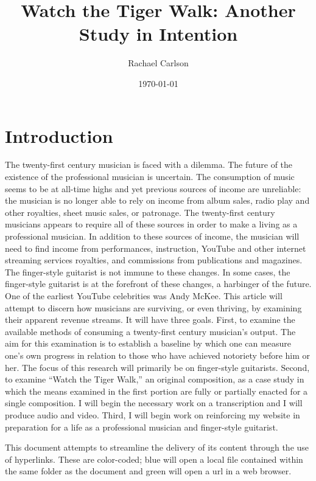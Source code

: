 \documentclass[unicode,hyperfootnotes=false,xetex,colorlinks=true,nofonts,nobib]{tufte-handout}
\title{Watch the Tiger Walk: Another Study in Intention}
\author{Rachael Carlson}
\date{\today}
\begin{document}
\maketitle

\section{Introduction}
The twenty-first century musician is faced with a dilemma. The future of the existence of the professional musician is uncertain. The consumption of music seems to be at all-time highs and yet previous sources of income are unreliable: the musician is no longer able to rely on income from album sales, radio play and other royalties, sheet music sales, or patronage. The twenty-first century musicians appears to require all of these sources in order to make a living as a professional musician. In addition to these sources of income, the musician will need to find income from performances, instruction, YouTube and other internet streaming services royalties, and commissions from publications and magazines. \\

The finger-style guitarist is not immune to these changes. In some cases, the finger-style guitarist is at the forefront of these changes, a harbinger of the future. One of the earliest YouTube celebrities was Andy McKee. This article will attempt to discern how musicians are surviving, or even thriving, by examining their apparent revenue streams. It will have three goals. First, to examine the available methods of consuming a twenty-first century musician's output. The aim for this examination is to establish a baseline by which one can measure one's own progress in relation to those who have achieved notoriety before him or her. The focus of this research will primarily be on finger-style guitarists.  Second, to examine ``Watch the Tiger Walk,'' an original composition, as a case study in which the means examined in the first portion are fully or partially enacted for a single composition. I will begin the necessary work on a transcription and I will produce audio and video.  Third, I will begin work on reinforcing my website in preparation for a life as a professional musician and finger-style guitarist.

This document attempts to streamline the delivery of its content through the use of hyperlinks. These are color-coded; blue will open a local file contained within the same folder as the document and green will open a url in a web browser.
\end{document}
